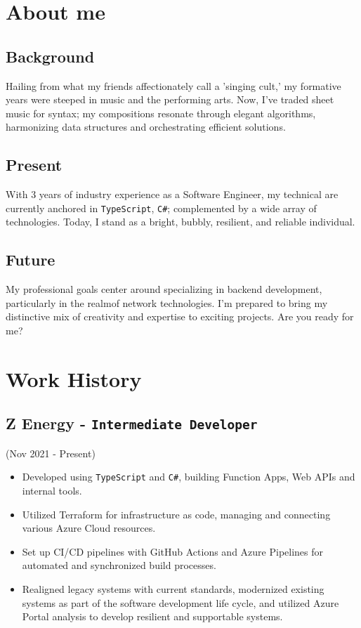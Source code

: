 \documentclass[a4paper, 10pt]{article}
\newcommand{\code}[1]{\mbox{\textcolor{code}{\texttt{#1}}}}
\begin{document}
\begin{multicols*}{2}
	\section{About me}
	\subsection{Background}
	Hailing from what my friends affectionately call a 'singing cult,' my formative years were steeped in music and the performing arts. Now, I've traded sheet music for syntax; my compositions resonate through elegant algorithms, harmonizing data structures and orchestrating efficient solutions.
	\subsection{Present}
	With 3 years of industry experience as a Software Engineer, my technical are currently anchored in \code{TypeScript}, \code{C\#}; complemented by a wide array of technologies. Today, I stand as a bright, bubbly, resilient, and reliable individual.
	\subsection{Future}
	My professional goals center around specializing in backend development, particularly in the realmof network technologies. I'm prepared to bring my distinctive mix of creativity and expertise to exciting projects. Are you ready for me?

	\vfill\null
	\columnbreak

	\section{Work History}
	\subsection{Z Energy - \texttt{Intermediate Developer}}
	{\small(Nov 2021 - Present)}
	\begin{itemize}[itemsep=0pt, leftmargin=0pt]
		\item Developed using \code{TypeScript} and \code{C\#}, building Function Apps, Web APIs and internal tools.
		\item Utilized Terraform for infrastructure as code, managing and connecting various Azure Cloud resources.
		\item Set up CI/CD pipelines with GitHub Actions and Azure Pipelines for automated and synchronized build processes.
		\item Realigned legacy systems with current standards, modernized existing systems as part of the software development life cycle, and utilized Azure Portal analysis to develop resilient and supportable systems.
	\end{itemize}

\end{multicols*}
\end{document}
